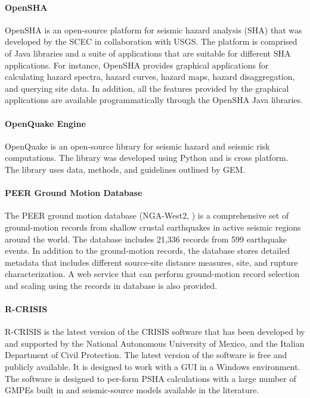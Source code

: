 \paragraph{OpenSHA} OpenSHA \citep{field2003opensha} is an open-source platform for seismic hazard analysis (SHA) that was developed by the SCEC in collaboration with USGS. The platform is comprised of Java libraries and a suite of applications that are suitable for different SHA applications. For instance, OpenSHA provides graphical applications for calculating hazard spectra, hazard curves, hazard maps, hazard disaggregation, and querying site data. In addition, all the features provided by the graphical applications are available programmatically through the OpenSHA Java libraries.

\paragraph{OpenQuake Engine} OpenQuake \citep{pagani2014openquake} is an open-source library for seismic hazard and seismic risk computations. The library was developed using Python and is cross platform. The library uses data, methods, and guidelines outlined by GEM.

\paragraph{PEER Ground Motion Database} The PEER ground motion database (NGA-West2, \cite{ancheta2014ngawest2}) is a comprehensive set of ground-motion records from shallow crustal earthquakes in active seismic regions around the world. The database includes 21,336 records from 599 earthquake events. In addition to the ground-motion records, the database stores detailed metadata that includes different source-site distance measures, site, and rupture characterization. A web service that can perform ground-motion record selection and scaling using the records in database is also provided.

\paragraph{R-CRISIS } R-CRISIS is the latest version of the CRISIS software that has been developed by \cite{ordaz2013crisis2008} and supported by the National Autonomous University of Mexico, and the Italian Department of Civil Protection. The latest version of the software is free and publicly available. It is designed to work with a GUI in a Windows environment. The software is designed to per-form PSHA calculations with a large number of GMPEs built in and seismic-source models available in the literature.


